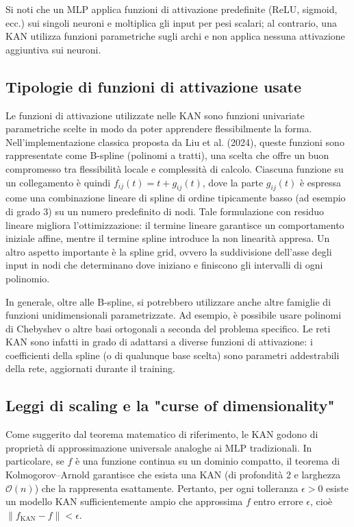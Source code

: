 \documentclass[a4paper,12pt]{report}
\begin{document}
	Si noti che un MLP applica funzioni di attivazione predefinite (ReLU, sigmoid, ecc.) sui singoli neuroni e moltiplica gli input per pesi scalari; al contrario, una KAN utilizza funzioni parametriche sugli archi e non applica nessuna attivazione aggiuntiva sui neuroni.
	
	\subsection{Tipologie di funzioni di attivazione usate}
	
	Le funzioni di attivazione utilizzate nelle KAN sono funzioni univariate parametriche scelte in modo da poter apprendere flessibilmente la forma. Nell’implementazione classica proposta da Liu et al. (2024), queste funzioni sono rappresentate come B-spline (polinomi a tratti), una scelta che offre un buon compromesso tra flessibilità locale e complessità di calcolo. Ciascuna funzione su un collegamento è quindi $f_{ij}(t) = t + g_{ij}(t)$, dove la parte $g_{ij}(t)$ è espressa come una combinazione lineare di spline di ordine tipicamente basso (ad esempio di grado 3) su un numero predefinito di nodi. Tale formulazione con residuo lineare migliora l’ottimizzazione: il termine lineare garantisce un comportamento iniziale affine, mentre il termine spline introduce la non linearità appresa. Un altro aspetto importante è la spline grid, ovvero la suddivisione dell'asse degli input in nodi che determinano dove iniziano e finiscono gli intervalli di ogni polinomio.
	
	In generale, oltre alle B-spline, si potrebbero utilizzare anche altre famiglie di funzioni unidimensionali parametrizzate. Ad esempio, è possibile usare polinomi di Chebyshev o altre basi ortogonali a seconda del problema specifico. Le reti KAN sono infatti in grado di adattarsi a diverse funzioni di attivazione: i coefficienti della spline (o di qualunque base scelta) sono parametri addestrabili della rete, aggiornati durante il training.
	
	\subsection{Leggi di scaling e la "curse of dimensionality"}
	
	Come suggerito dal teorema matematico di riferimento, le KAN godono di proprietà di approssimazione universale analoghe ai MLP tradizionali. In particolare, se $f$ è una funzione continua su un dominio compatto, il teorema di Kolmogorov–Arnold garantisce che esista una KAN (di profondità 2 e larghezza $\mathcal{O}(n)$) che la rappresenta esattamente. Pertanto, per ogni tolleranza $\epsilon>0$ esiste un modello KAN sufficientemente ampio che approssima $f$ entro errore $\epsilon$, cioè $\|f_{\text{KAN}}-f\|<\epsilon$.
\end{document}
